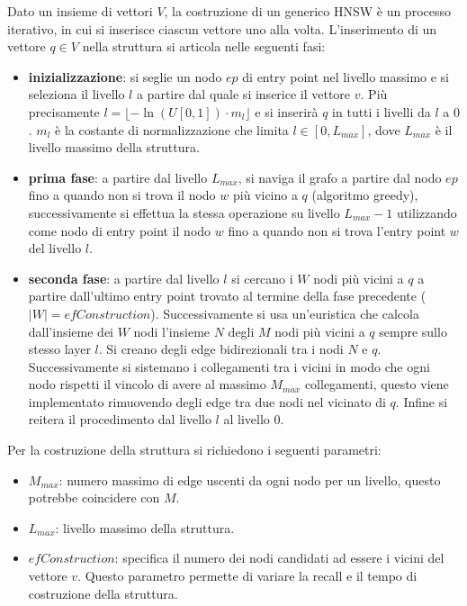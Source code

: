 Dato un insieme di vettori $V$, la costruzione di un generico HNSW  è un processo 
iterativo, in cui si inserisce ciascun vettore uno alla volta. L'inserimento di 
un vettore $q\in V$ nella struttura si articola nelle seguenti fasi:
\begin{itemize}
    \item \textbf{inizializzazione}: si seglie un nodo $ep$ di entry point nel livello massimo
    e si seleziona il livello $l$ a partire dal quale si inserice il vettore $v$.
    Più precisamente $l = \lfloor-\ln (U[0,1])\cdot m_l\rfloor$ e si inserirà $q$ 
    in tutti i livelli da $l$ a $0$. $m_l$ è la costante di normalizzazione che 
    limita $l\in [0, L_{max}]$, dove $L_{max}$ è il livello massimo della struttura.
    \item \textbf{prima fase}: a partire dal livello $L_{max}$, si naviga il grafo 
    a partire dal nodo $ep$ fino a quando non si trova il nodo $w$ più vicino a
    $q$ (algoritmo greedy), successivamente si effettua la stessa operazione 
    su livello $L_{max} - 1$ utilizzando come nodo di entry point il nodo $w$ fino 
    a quando non si trova l'entry point $w$ del livello $l$.
    \item \textbf{seconda fase}: a partire dal livello $l$ si cercano i $W$ nodi 
    più vicini a $q$ a partire dall'ultimo entry point trovato al termine della fase precedente ($|W| = efConstruction$).
    Successivamente si usa un'euristica che calcola dall'insieme dei $W$ nodi
    l'insieme $N$ degli $M$ nodi più vicini a $q$ sempre sullo stesso layer $l$. 
    Si creano degli edge bidirezionali tra i nodi $N$ e $q$. Successivamente si 
    sistemano i collegamenti tra i vicini in modo che ogni nodo rispetti il vincolo 
    di avere al massimo $M_{max}$ collegamenti, questo viene implementato rimuovendo 
    degli edge tra due nodi nel vicinato di $q$. Infine si reitera il procedimento 
    dal livello $l$ al livello $0$.
\end{itemize}

Per la costruzione della struttura si richiedono i seguenti parametri:
\begin{itemize}
    \item $M_{max}$: numero massimo di edge uscenti da ogni nodo per un livello, questo 
    potrebbe coincidere con $M$.
    \item $L_{max}$: livello massimo della struttura.
    \item $efConstruction$: specifica il numero dei nodi candidati ad essere i vicini 
    del vettore $v$. Questo parametro permette di variare la recall e il tempo di 
    costruzione della struttura.
\end{itemize} 


